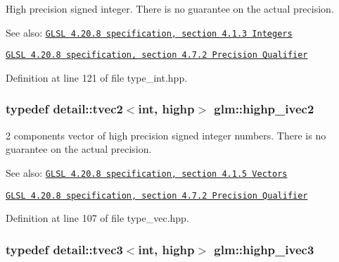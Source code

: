 High precision signed integer. There is no guarantee on the actual precision.

\begin{Desc}
\item[See also:]\href{http://www.opengl.org/registry/doc/GLSLangSpec.4.20.8.pdf}{\tt GLSL 4.20.8 specification, section 4.1.3 Integers} 

\href{http://www.opengl.org/registry/doc/GLSLangSpec.4.20.8.pdf}{\tt GLSL 4.20.8 specification, section 4.7.2 Precision Qualifier} \end{Desc}


Definition at line 121 of file type\_\-int.hpp.\hypertarget{group__core__precision_gb2bac6095f51f7d7f74747afc2f6747a}{
\subsubsection[highp\_\-ivec2]{\setlength{\rightskip}{0pt plus 5cm}typedef detail::tvec2$<$int, highp$>$ {\bf glm::highp\_\-ivec2}}}
\label{group__core__precision_gb2bac6095f51f7d7f74747afc2f6747a}


2 components vector of high precision signed integer numbers. There is no guarantee on the actual precision.

\begin{Desc}
\item[See also:]\href{http://www.opengl.org/registry/doc/GLSLangSpec.4.20.8.pdf}{\tt GLSL 4.20.8 specification, section 4.1.5 Vectors} 

\href{http://www.opengl.org/registry/doc/GLSLangSpec.4.20.8.pdf}{\tt GLSL 4.20.8 specification, section 4.7.2 Precision Qualifier} \end{Desc}


Definition at line 107 of file type\_\-vec.hpp.\hypertarget{group__core__precision_ge9f0a321de8ee92dce9d4400362d71e7}{
\subsubsection[highp\_\-ivec3]{\setlength{\rightskip}{0pt plus 5cm}typedef detail::tvec3$<$int, highp$>$ {\bf glm::highp\_\-ivec3}}}
\label{group__core__precision_ge9f0a321de8ee92dce9d4400362d71e7}


